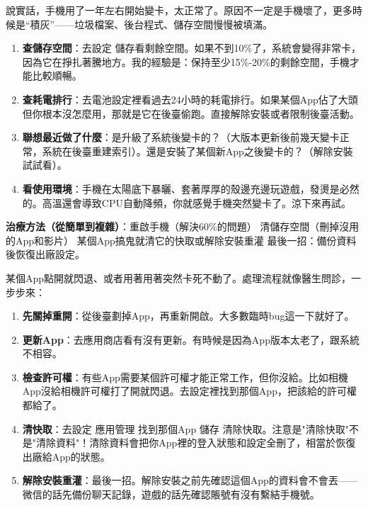 


說實話，手機用了一年左右開始變卡，太正常了。原因不一定是手機壞了，更多時候是“積灰”——垃圾檔案、後台程式、儲存空間慢慢被填滿。


\begin{enumerate}
  \item \textbf{查儲存空間}：去設定 儲存看剩餘空間。如果不到10\%了，系統會變得非常卡，因為它在掙扎著騰地方。我的經驗是：保持至少15\%-20\%的剩餘空間，手機才能比較順暢。
  \item \textbf{查耗電排行}：去電池設定裡看過去24小時的耗電排行。如果某個App佔了大頭但你根本沒怎麼用，那就是它在後臺偷跑。直接解除安裝或者限制後臺活動。
  \item \textbf{聯想最近做了什麼}：是升級了系統後變卡的？（大版本更新後前幾天變卡正常，系統在後臺重建索引）。還是安裝了某個新App之後變卡的？（解除安裝試試看）。
  \item \textbf{看使用環境}：手機在太陽底下暴曬、套著厚厚的殼邊充邊玩遊戲，發燙是必然的。高溫還會導致CPU自動降頻，你就感覺手機突然變卡了。涼下來再試。
\end{enumerate}

\textbf{治療方法（從簡單到複雜）}：重啟手機（解決60\%的問題） 清儲存空間（刪掉沒用的App和影片） 某個App搞鬼就清它的快取或解除安裝重灌 最後一招：備份資料後恢復出廠設定。


某個App點開就閃退、或者用著用著突然卡死不動了。處理流程就像醫生問診，一步步來：

\begin{enumerate}
  \item \textbf{先關掉重開}：從後臺劃掉App，再重新開啟。大多數臨時bug這一下就好了。
  \item \textbf{更新App}：去應用商店看有沒有更新。有時候是因為App版本太老了，跟系統不相容。
  \item \textbf{檢查許可權}：有些App需要某個許可權才能正常工作，但你沒給。比如相機App沒給相機許可權打了開就閃退。去設定裡找到那個App，把該給的許可權都給了。
  \item \textbf{清快取}：去設定 應用管理 找到那個App 儲存 清除快取。注意是"清除快取"不是"清除資料"！清除資料會把你App裡的登入狀態和設定全刪了，相當於恢復出廠給App的狀態。
  \item \textbf{解除安裝重灌}：最後一招。解除安裝之前先確認這個App的資料會不會丟——微信的話先備份聊天記錄，遊戲的話先確認賬號有沒有繫結手機號。
\end{enumerate}

